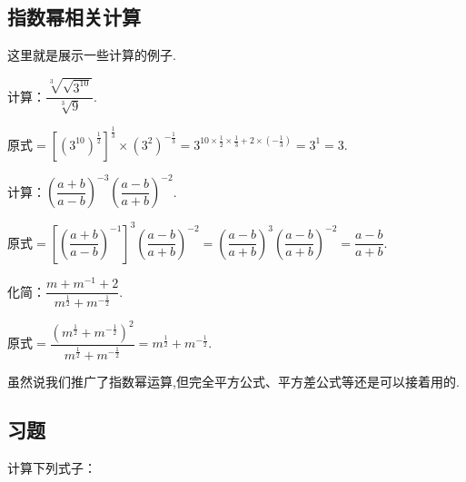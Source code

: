 \documentclass[lang=cn,math=cm,chinesefont=nofont,11pt,scheme=chinese,twocol]{elegantbook}
\begin{document}
\subsection{指数幂相关计算}

这里就是展示一些计算的例子.

\begin{spacing}{1.8}
  \begin{example}\label{exp:2017RJB_bx2_P7.2.1}
    计算：$\dfrac{\sqrt[3]{\sqrt{3^{10}}}}{\sqrt[3]{9}}$.
  \end{example}
  
  \begin{solution}
    $\text{原式}=\left[\left(3^{10}\right)^{\frac12}\right]^{\frac13}\times\left(3^2\right)^{-\frac13}=3^{10\times\frac12\times\frac13+2\times\left(-\frac13\right)}=3^1=3.$
  \end{solution}
  
  \begin{example}\label{exp:ZXSXSYJC_reformatted_3_P7.1.4.3}
    计算：$\left(\dfrac{a+b}{a-b}\right)^{-3}\left(\dfrac{a-b}{a+b}\right)^{-2}$.
  \end{example}
  
  \begin{solution}
    $\text{原式}=\left[\left(\dfrac{a+b}{a-b}\right)^{-1}\right]^3\left(\dfrac{a-b}{a+b}\right)^{-2}=\left(\dfrac{a-b}{a+b}\right)^3\left(\dfrac{a-b}{a+b}\right)^{-2}=\dfrac{a-b}{a+b}.$
  \end{solution}
  
  \begin{example}\label{2017RJB_bx2_P7.3.2}
    化简：$\dfrac{m+m^{-1}+2}{m^{\frac12}+m^{-\frac12}}$.
  \end{example}
  
  \begin{solution}
    $\text{原式}=\dfrac{(m^\frac12+m^{-\frac12})^2}{m^\frac12+m^{-\frac12}}=m^\frac12+m^{-\frac12}.$
  \end{solution}
\end{spacing}

虽然说我们推广了指数幂运算,但完全平方公式、平方差公式等还是可以接着用的.

\subsection{习题}

\begin{exercise}
  计算下列式子：
\end{exercise}
\end{document}
